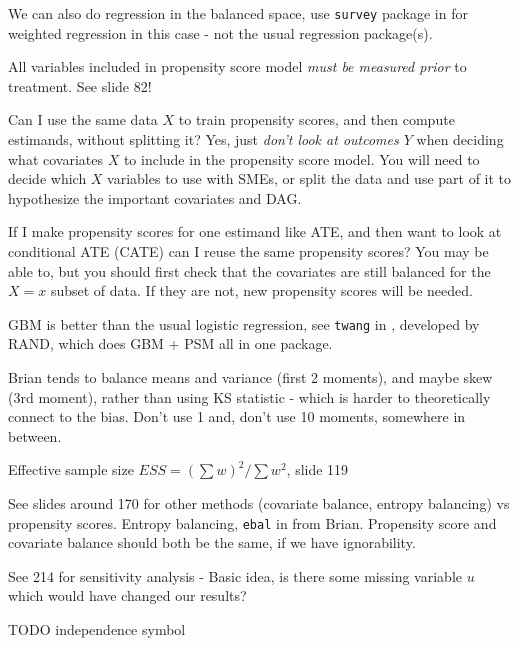 We can also do regression in the balanced space, use \texttt{survey} package in \R for weighted regression in this case - not the usual regression package(s).

All variables included in propensity score model \emph{must be measured prior} to treatment. See slide 82!

Can I use the same data $X$ to train propensity scores, and then compute estimands, without splitting it?
Yes, just \emph{don't look at outcomes $Y$} when deciding what covariates $X$ to include in the propensity score model.
You will need to decide which $X$ variables to use \apriori with SMEs,
or split the data and use part of it to hypothesize the important covariates and DAG.

If I make propensity scores for one estimand like ATE, and then want to look at conditional ATE (CATE) can I reuse the same propensity scores?
You may be able to, but you should first check that the covariates are still balanced for the $X = x$ subset of data. If they are not, new propensity scores will be needed.

GBM is better than the usual logistic regression, see \texttt{twang} in \R, developed by RAND, which does GBM + PSM all in one package.

Brian tends to balance means and variance (first 2 moments), and maybe skew (3rd moment), rather than using KS statistic - which is harder to theoretically connect to the bias.
Don't use 1 and, don't use 10 moments, somewhere in between.

Effective sample size $ESS = \left(\sum w\right)^2 / \sum w^2$, slide 119

See slides around 170 for other methods (covariate balance, entropy balancing) vs propensity scores.
Entropy balancing, \texttt{ebal} in \R from Brian.
Propensity score and covariate balance should both be the same, if we have ignorability.

See 214 for sensitivity analysis - Basic idea, is there some missing variable $u$ which would have changed our results?

TODO independence symbol \indep
